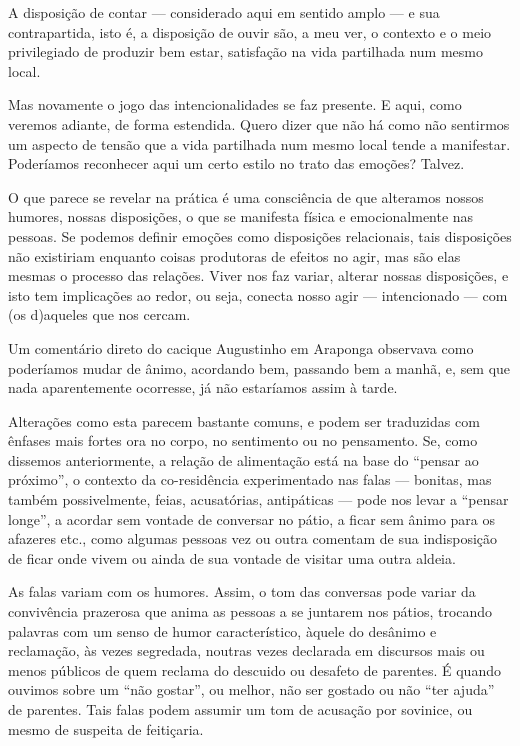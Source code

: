 \documentclass{article}
\begin{document}
A disposi\c{c}\~ao de contar --- considerado aqui em sentido amplo --- e
sua contrapartida, isto \'e, a disposi\c{c}\~ao de ouvir s\~ao, a meu
ver, o contexto e o meio privilegiado de produzir bem estar,
satisfa\c{c}\~ao na vida partilhada num mesmo local.

Mas novamente o jogo das intencionalidades se faz presente. E aqui, como
veremos adiante, de forma estendida. Quero dizer que n\~ao h\'a como
n\~ao sentirmos um aspecto de tens\~ao que a vida partilhada num mesmo
local tende a manifestar. Poder\'iamos reconhecer aqui um certo estilo
no trato das emo\c{c}\~oes? Talvez.

O que parece se revelar na pr\'atica \'e uma consci\^encia de que
alteramos nossos humores, nossas disposi\c{c}\~oes, o que se manifesta
f\'isica e emocionalmente nas pessoas. Se podemos definir emo\c{c}\~oes
como disposi\c{c}\~oes relacionais, tais disposi\c{c}\~oes n\~ao
existiriam enquanto coisas produtoras de efeitos no agir, mas s\~ao
elas mesmas o processo das rela\c{c}\~oes. Viver nos faz variar,
alterar nossas disposi\c{c}\~oes, e isto tem implica\c{c}\~oes ao
redor, ou seja, conecta nosso agir --- intencionado --- com (os
d)aqueles que nos cercam. 

Um coment\'ario direto do cacique Augustinho em Araponga observava como
poder\'iamos mudar de \^animo, acordando bem, passando bem a manh\~a,
e, sem que nada aparentemente ocorresse, j\'a n\~ao estar\'iamos assim
\`a tarde.

Altera\c{c}\~oes como esta parecem bastante comuns, e podem ser
traduzidas com \^enfases mais fortes ora no corpo, no sentimento ou no
pensamento. Se, como dissemos anteriormente, a rela\c{c}\~ao de
alimenta\c{c}\~ao est\'a na base do {\textquotedblleft}pensar ao
pr\'oximo{\textquotedblright}, o contexto da co-resid\^encia
experimentado nas falas --- bonitas, mas tamb\'em possivelmente, feias,
acusat\'orias, antip\'aticas --- pode nos levar a
{\textquotedblleft}pensar longe{\textquotedblright}, a acordar sem
vontade de conversar no p\'atio, a ficar sem \^animo para os afazeres
etc., como algumas pessoas vez ou outra comentam de sua
indisposi\c{c}\~ao de ficar onde vivem ou ainda de sua vontade de
visitar uma outra aldeia.

As falas variam com os humores. Assim, o tom das conversas pode variar
da conviv\^encia prazerosa que anima as pessoas a se juntarem nos
p\'atios, trocando palavras com um senso de humor caracter\'istico,
\`aquele do des\^animo e reclama\c{c}\~ao, \`as vezes segredada,
noutras vezes declarada em discursos mais ou menos p\'ublicos de quem
reclama do descuido ou desafeto de parentes. \'E quando ouvimos sobre
um {\textquotedblleft}n\~ao gostar{\textquotedblright}, ou melhor,
n\~ao ser gostado ou n\~ao {\textquotedblleft}ter
ajuda{\textquotedblright} de parentes. Tais falas podem assumir um tom
de acusa\c{c}\~ao por sovinice, ou mesmo de suspeita de feiti\c{c}aria.
\end{document}
